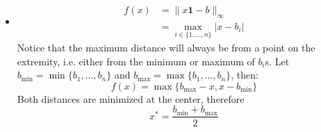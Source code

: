 \documentclass{article}
\newcommand{\1}{\mathbf{1}}
\begin{document}
\begin{itemize}
\begin{itemize}
\begin{align*}
      \Rightarrow g'(x) &= 2 \cdot \sum_{i=1}^n (x - b_i) \\
      &= 2n x - 2 \cdot \sum_{i=1}^n b_i
    \end{align*}
    Setting the dervitive to 0:
    \begin{align*}
      2n x^* - 2 \cdot \sum_{i=1}^n b_i &= 0 \\
      \Rightarrow n x^* &= \sum_{i=1}^n b_i \\
      \Rightarrow x^* &= \frac{\sum_{i=1}^n b_i}{n}
    \end{align*}
    \item[$\ell_\infty$-norm]
    \begin{align*}
      f(x) &= \|x \1 - b\|_\infty \\
      &= \max_{i \in \{1, \dots, n\}} |x - b_i|
    \end{align*}
    Notice that the maximum distance will always be from a point on the extremity, i.e. either from the minimum or maximum of $b_i$s. Let $b_{\min} = \min \{b_1, \dots, b_n\}$ and $b_{\max} = \max \{b_1, \dots, b_n\}$, then:
    \[ f(x) = \max \{b_{\max} - x, x - b_{\min}\} \]
    Both distances are minimized at the center, therefore
    \[ x^* = \frac{b_{\min} + b_{\max}}{2} \]
  \end{itemize}


\end{itemize}
\end{document}
